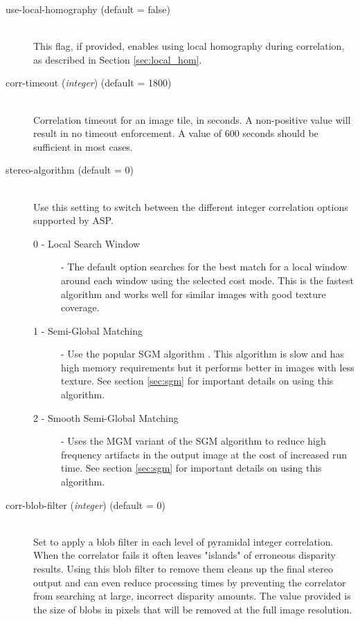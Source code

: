 \begin{description}
\item[use-local-homography \textnormal (default = false)] \hfill \\

  This flag, if provided, enables using local homography during
  correlation, as described in Section \ref{sec:local_hom}.

\item[corr-timeout \textnormal{\small{(\emph{integer})}} (default = 1800)]\hfill \\

  Correlation timeout for an image tile, in seconds. A non-positive
value will result in no timeout enforcement. A value of 600 seconds
should be sufficient in most cases.

\item[stereo-algorithm \textnormal (default = 0)] \hfill \\

  Use this setting to switch between the different integer correlation options supported by ASP.  
  \begin{description}
    \item[0 - Local Search Window] - The default option searches for the best match
    for a local window around each window using the selected cost mode.  This is the 
    fastest algorithm and works well for similar images with good texture coverage.

    \item[1 - Semi-Global Matching] - Use the popular SGM algorithm \citep{hirschmuller_sgm_original}.
    This algorithm is slow and has high memory requirements but it performs better in images with
    less texture.  See section \ref{sec:sgm} for important details on using this algorithm.

    \item[2 - Smooth Semi-Global Matching] - Uses the MGM variant of the SGM algorithm 
    \citep{facciolo2015mgm} to reduce high frequency artifacts in the output image at the cost 
    of increased run time. See section \ref{sec:sgm} for important details on using this algorithm.
  \end{description}

\item[corr-blob-filter \textnormal{\small{(\emph{integer})}} (default = 0)]\hfill \\

  Set to apply a blob filter in each level of pyramidal integer correlation.
  When the correlator fails it often leaves "islands" of erroneous disparity results.
  Using this blob filter to remove them cleans up the final stereo output and
  can even reduce processing times by preventing the correlator from searching
  at large, incorrect disparity amounts.  The value provided is the size of blobs
  in pixels that will be removed at the full image resolution.


\end{description}
